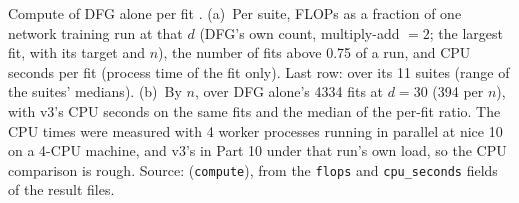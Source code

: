 \begin{table}[t]
\centering{\footnotesize\setlength{\tabcolsep}{4pt}
\par\bigskip
\setlength{\tabcolsep}{3pt}}
\caption{Compute of DFG alone per fit . (a)~Per suite, FLOPs as a fraction of one network training run at that $d$ (DFG's own count, multiply-add $=2$; the largest fit, with its target and $n$), the number of fits above 0.75 of a run, and CPU seconds per fit (process time of the fit only). Last row:  over its 11 suites (range of the suites' medians). (b)~By $n$, over DFG alone's 4334 fits at $d=30$ (394 per $n$), with v3's CPU seconds on the same fits and the median of the per-fit ratio. The CPU times were measured with 4 worker processes running in parallel at nice 10 on a 4-CPU machine, and v3's in Part 10 under that run's own load, so the CPU comparison is rough. Source:  (\texttt{compute}), from the \texttt{flops} and \texttt{cpu\_seconds} fields of the result files.}
\label{tab:compute}
\end{table}
